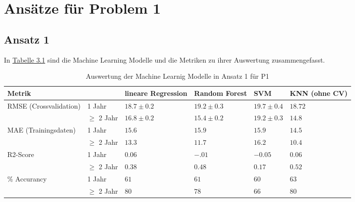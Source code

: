 

\section{Ans\"atze f\"ur Problem 1}


\subsection{Ansatz 1}
In \hyperref[tab:ergebnisA1P1]{Tabelle 3.1} sind die Machine Learning Modelle und die Metriken zu ihrer Auswertung zusammengefasst.

\begin{table}[ht]
  \caption{\label{tab:ergebnisA1P1} Auswertung der Machine Learnig Modelle in Ansatz 1 f\"ur P1}
  \begin{tabular}{ p{3cm} p{2cm} p{2cm} p{2cm} p{2cm} p{1.5cm} }
    \toprule
    Metrik &               & lineare Regression & Random Forest  & SVM            & KNN (ohne CV) \\
    \midrule
    \multirow{2}{3em}{RMSE (Crossvalidation)}
           & 1 Jahr        & $18.7 \pm 0.2$     & $19.2 \pm 0.3$ & $19.7 \pm 0.4$ & $18.72$       \\
           & $\geq$ 2 Jahr & $16.8 \pm 0.2$     & $15.4 \pm 0.2$ & $19.2 \pm 0.3$ & $14.8$        \\

    \midrule
    \multirow{2}{3em}{MAE (Trainingsdaten)}
           & 1 Jahr        & $15.6$             & $15.9$         & $15.9$         & $14.5$        \\
           & $\geq$ 2 Jahr & $13.3$             & $11.7$         & $16.2$         & $10.4$        \\

    \midrule
    \multirow{2}{3em}{R2-Score}
           & 1 Jahr        & $0.06$             & $-.01$         & $-0.05$        & $0.06$        \\
           & $\geq$ 2 Jahr & $0.38$             & $0.48$         & $0.17$         & $0.52$        \\

    \midrule
    \multirow{2}{3em}{$\%$ Accurancy}
           & 1 Jahr        & $61$               & $61$           & $60$           & $63$          \\
           & $\geq$ 2 Jahr & $80$               & $78$           & $66$           & $80$          \\

    \bottomrule
  \end{tabular}

\end{table}

